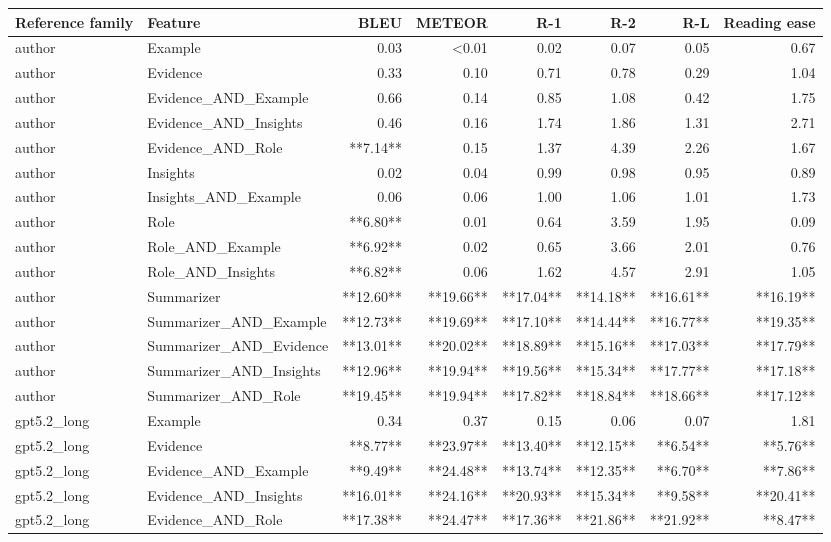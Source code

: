 \begin{tabular}{llrrrrrr}
\toprule
Reference family & Feature & BLEU & METEOR & R-1 & R-2 & R-L & Reading ease \\
\midrule
author & Example & 0.03 & <0.01 & 0.02 & 0.07 & 0.05 & 0.67 \\
author & Evidence & 0.33 & 0.10 & 0.71 & 0.78 & 0.29 & 1.04 \\
author & Evidence_AND_Example & 0.66 & 0.14 & 0.85 & 1.08 & 0.42 & 1.75 \\
author & Evidence_AND_Insights & 0.46 & 0.16 & 1.74 & 1.86 & 1.31 & 2.71 \\
author & Evidence_AND_Role & **7.14** & 0.15 & 1.37 & 4.39 & 2.26 & 1.67 \\
author & Insights & 0.02 & 0.04 & 0.99 & 0.98 & 0.95 & 0.89 \\
author & Insights_AND_Example & 0.06 & 0.06 & 1.00 & 1.06 & 1.01 & 1.73 \\
author & Role & **6.80** & 0.01 & 0.64 & 3.59 & 1.95 & 0.09 \\
author & Role_AND_Example & **6.92** & 0.02 & 0.65 & 3.66 & 2.01 & 0.76 \\
author & Role_AND_Insights & **6.82** & 0.06 & 1.62 & 4.57 & 2.91 & 1.05 \\
author & Summarizer & **12.60** & **19.66** & **17.04** & **14.18** & **16.61** & **16.19** \\
author & Summarizer_AND_Example & **12.73** & **19.69** & **17.10** & **14.44** & **16.77** & **19.35** \\
author & Summarizer_AND_Evidence & **13.01** & **20.02** & **18.89** & **15.16** & **17.03** & **17.79** \\
author & Summarizer_AND_Insights & **12.96** & **19.94** & **19.56** & **15.34** & **17.77** & **17.18** \\
author & Summarizer_AND_Role & **19.45** & **19.94** & **17.82** & **18.84** & **18.66** & **17.12** \\
gpt5.2_long & Example & 0.34 & 0.37 & 0.15 & 0.06 & 0.07 & 1.81 \\
gpt5.2_long & Evidence & **8.77** & **23.97** & **13.40** & **12.15** & **6.54** & **5.76** \\
gpt5.2_long & Evidence_AND_Example & **9.49** & **24.48** & **13.74** & **12.35** & **6.70** & **7.86** \\
gpt5.2_long & Evidence_AND_Insights & **16.01** & **24.16** & **20.93** & **15.34** & **9.58** & **20.41** \\
gpt5.2_long & Evidence_AND_Role & **17.38** & **24.47** & **17.36** & **21.86** & **21.92** & **8.47** \\

\end{tabular}
